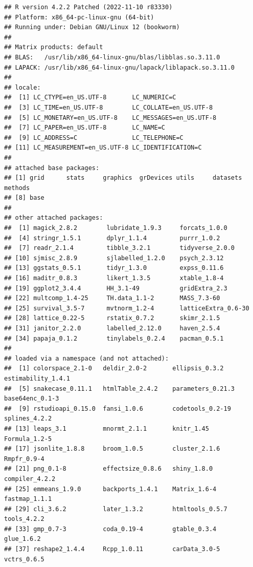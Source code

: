 \documentclass[
  doc]{apa6}
\begin{document}
\begin{verbatim}
## R version 4.2.2 Patched (2022-11-10 r83330)
## Platform: x86_64-pc-linux-gnu (64-bit)
## Running under: Debian GNU/Linux 12 (bookworm)
## 
## Matrix products: default
## BLAS:   /usr/lib/x86_64-linux-gnu/blas/libblas.so.3.11.0
## LAPACK: /usr/lib/x86_64-linux-gnu/lapack/liblapack.so.3.11.0
## 
## locale:
##  [1] LC_CTYPE=en_US.UTF-8       LC_NUMERIC=C              
##  [3] LC_TIME=en_US.UTF-8        LC_COLLATE=en_US.UTF-8    
##  [5] LC_MONETARY=en_US.UTF-8    LC_MESSAGES=en_US.UTF-8   
##  [7] LC_PAPER=en_US.UTF-8       LC_NAME=C                 
##  [9] LC_ADDRESS=C               LC_TELEPHONE=C            
## [11] LC_MEASUREMENT=en_US.UTF-8 LC_IDENTIFICATION=C       
## 
## attached base packages:
## [1] grid      stats     graphics  grDevices utils     datasets  methods  
## [8] base     
## 
## other attached packages:
##  [1] magick_2.8.2        lubridate_1.9.3     forcats_1.0.0      
##  [4] stringr_1.5.1       dplyr_1.1.4         purrr_1.0.2        
##  [7] readr_2.1.4         tibble_3.2.1        tidyverse_2.0.0    
## [10] sjmisc_2.8.9        sjlabelled_1.2.0    psych_2.3.12       
## [13] ggstats_0.5.1       tidyr_1.3.0         expss_0.11.6       
## [16] maditr_0.8.3        likert_1.3.5        xtable_1.8-4       
## [19] ggplot2_3.4.4       HH_3.1-49           gridExtra_2.3      
## [22] multcomp_1.4-25     TH.data_1.1-2       MASS_7.3-60        
## [25] survival_3.5-7      mvtnorm_1.2-4       latticeExtra_0.6-30
## [28] lattice_0.22-5      rstatix_0.7.2       skimr_2.1.5        
## [31] janitor_2.2.0       labelled_2.12.0     haven_2.5.4        
## [34] papaja_0.1.2        tinylabels_0.2.4    pacman_0.5.1       
## 
## loaded via a namespace (and not attached):
##  [1] colorspace_2.1-0   deldir_2.0-2       ellipsis_0.3.2     estimability_1.4.1
##  [5] snakecase_0.11.1   htmlTable_2.4.2    parameters_0.21.3  base64enc_0.1-3   
##  [9] rstudioapi_0.15.0  fansi_1.0.6        codetools_0.2-19   splines_4.2.2     
## [13] leaps_3.1          mnormt_2.1.1       knitr_1.45         Formula_1.2-5     
## [17] jsonlite_1.8.8     broom_1.0.5        cluster_2.1.6      Rmpfr_0.9-4       
## [21] png_0.1-8          effectsize_0.8.6   shiny_1.8.0        compiler_4.2.2    
## [25] emmeans_1.9.0      backports_1.4.1    Matrix_1.6-4       fastmap_1.1.1     
## [29] cli_3.6.2          later_1.3.2        htmltools_0.5.7    tools_4.2.2       
## [33] gmp_0.7-3          coda_0.19-4        gtable_0.3.4       glue_1.6.2        
## [37] reshape2_1.4.4     Rcpp_1.0.11        carData_3.0-5      vctrs_0.6.5       

\end{verbatim}
\end{document}
